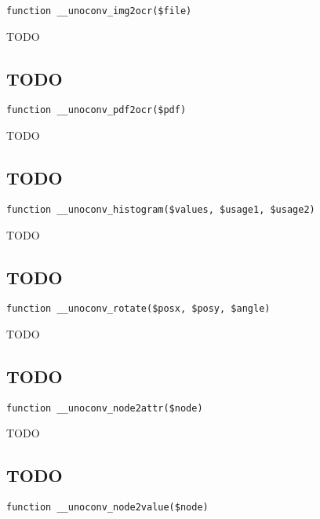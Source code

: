 \documentclass[a4paper]{book}
\begin{document}
\begin{lstlisting}
function __unoconv_img2ocr($file)
\end{lstlisting}

TODO

\hypertarget{toc294}{}
\subsection{TODO}

\begin{lstlisting}
function __unoconv_pdf2ocr($pdf)
\end{lstlisting}

TODO

\hypertarget{toc295}{}
\subsection{TODO}

\begin{lstlisting}
function __unoconv_histogram($values, $usage1, $usage2)
\end{lstlisting}

TODO

\hypertarget{toc296}{}
\subsection{TODO}

\begin{lstlisting}
function __unoconv_rotate($posx, $posy, $angle)
\end{lstlisting}

TODO

\hypertarget{toc297}{}
\subsection{TODO}

\begin{lstlisting}
function __unoconv_node2attr($node)
\end{lstlisting}

TODO

\hypertarget{toc298}{}
\subsection{TODO}

\begin{lstlisting}
function __unoconv_node2value($node)
\end{lstlisting}
\end{document}
